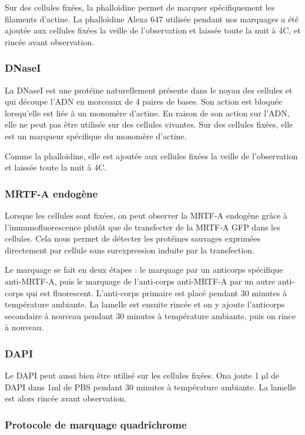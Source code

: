 \documentclass{report}
\newcommand{\micro}{$\mathrm{\mu}$}
\begin{document}
		Sur des cellules fixées, la phalloïdine permet de marquer spécifiquement les filaments d'actine. La phalloïdine Alexa 647 utilisée pendant nos marquages a été ajoutée aux cellules fixées la veille de l'observation et laissée toute la nuit à 4\degres C, et rincée avant observation. 
		\subsubsection{DNaseI}
		La DNaseI est une protéine naturellement présente dans le noyau des cellules et qui découpe l'ADN en morceaux de 4 paires de bases. Son action est bloquée lorsqu'elle est liée à un monomère d'actine. En raison de son action sur l'ADN, elle ne peut pas être utilisée sur des cellules vivantes. Sur des cellules fixées, elle est un marqueur spécifique du monomère d'actine. 
		
		Comme la phalloïdine, elle est ajoutée aux cellules fixées la veille de l'observation et laissée toute la nuit à 4\degres   C. 
		\subsubsection{MRTF-A endogène}
		
		Lorsque les cellules sont fixées, on peut observer la MRTF-A endogène grâce à l'immunofluorescence plutôt que de transfecter de la MRTF-A GFP dans les cellules. Cela nous permet de détecter les protéines sauvages exprimées directement par cellule sans surexpression induite par la transfection. 
		
		Le marquage se fait en deux étapes : le marquage par un anticorps spécifique anti-MRTF-A, puis le marquage de l'anti-corps anti-MRTF-A par un autre anti-corps qui est fluorescent. L'anti-corps primaire est placé pendant 30 minutes à température ambiante. La lamelle est ensuite rincée et on y ajoute l'anticorps secondaire à nouveau pendant 30 minutes à température ambiante, puis on rince à nouveau. 
		 
		\subsubsection{DAPI}
		Le DAPI peut aussi bien être utilisé sur les cellules fixées. Ona joute 1  \micro l de DAPI dans 1ml de PBS pendant 30 minutes à température ambiante. La lamelle est alors rincée avant observation. 

\subsubsection{Protocole de marquage quadrichrome}
\end{document}
